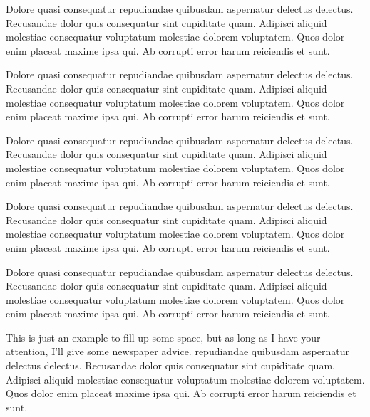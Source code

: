 \documentclass{article}
\date{\today}
\begin{document}
\maketitle

\begin{multicols}{2}{


\Large

Dolore quasi consequatur repudiandae quibusdam aspernatur delectus delectus. Recusandae dolor quis consequatur sint cupiditate quam. Adipisci aliquid molestiae consequatur voluptatum molestiae dolorem voluptatem. Quos dolor enim placeat maxime ipsa qui. Ab corrupti error harum reiciendis et sunt.

Dolore quasi consequatur repudiandae quibusdam aspernatur delectus delectus. Recusandae dolor quis consequatur sint cupiditate quam. Adipisci aliquid molestiae consequatur voluptatum molestiae dolorem voluptatem. Quos dolor enim placeat maxime ipsa qui. Ab corrupti error harum reiciendis et sunt.

Dolore quasi consequatur repudiandae quibusdam aspernatur delectus delectus. Recusandae dolor quis consequatur sint cupiditate quam. Adipisci aliquid molestiae consequatur voluptatum molestiae dolorem voluptatem. Quos dolor enim placeat maxime ipsa qui. Ab corrupti error harum reiciendis et sunt.

Dolore quasi consequatur repudiandae quibusdam aspernatur delectus delectus. Recusandae dolor quis consequatur sint cupiditate quam. Adipisci aliquid molestiae consequatur voluptatum molestiae dolorem voluptatem. Quos dolor enim placeat maxime ipsa qui. Ab corrupti error harum reiciendis et sunt.

Dolore quasi consequatur repudiandae quibusdam aspernatur delectus delectus. Recusandae dolor quis consequatur sint cupiditate quam. Adipisci aliquid molestiae consequatur voluptatum molestiae dolorem voluptatem. Quos dolor enim placeat maxime ipsa qui. Ab corrupti error harum reiciendis et sunt.

\closearticle

This is just an example to fill up some space, but as long as I have your attention, I'll give some newspaper advice.
 repudiandae quibusdam aspernatur delectus delectus. Recusandae dolor quis consequatur sint cupiditate quam. Adipisci aliquid molestiae consequatur voluptatum molestiae dolorem voluptatem. Quos dolor enim placeat maxime ipsa qui. Ab corrupti error harum reiciendis et sunt.

}
\end{multicols}
\end{document}
